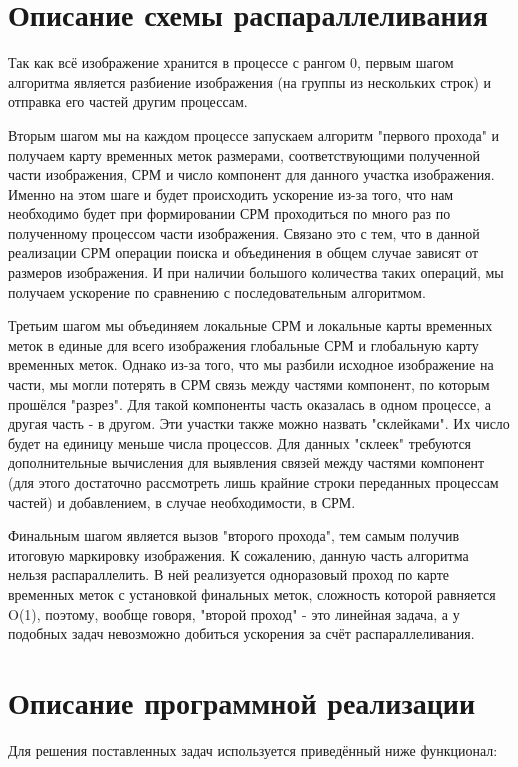\documentclass{report}
\begin{document}
	\section*{Описание схемы распараллеливания}
		\par Так как всё изображение хранится в процессе с рангом 0, первым шагом алгоритма является разбиение изображения (на группы из нескольких строк) и отправка его частей другим процессам.
		\par Вторым шагом мы на каждом процессе запускаем алгоритм "первого прохода" и получаем карту временных меток размерами, соответствующими полученной части изображения, СРМ и число компонент для данного участка изображения. Именно на этом шаге и будет происходить ускорение из-за того, что нам необходимо будет при формировании СРМ проходиться по много раз по полученному процессом части изображения. Связано это с тем, что в данной реализации СРМ операции поиска и объединения в общем случае зависят от размеров изображения. И при наличии большого количества таких операций, мы получаем ускорение по сравнению с последовательным алгоритмом.
		\par Третьим шагом мы объединяем локальные СРМ и локальные карты временных меток в единые для всего изображения глобальные СРМ и глобальную карту временных меток. Однако из-за того, что мы разбили исходное изображение на части, мы могли потерять в СРМ связь между частями компонент, по которым прошёлся "разрез". Для такой компоненты часть оказалась в одном процессе, а другая часть - в другом. Эти участки также можно назвать "склейками". Их число будет на единицу меньше числа процессов. Для данных "склеек" требуются дополнительные вычисления для выявления связей между частями компонент (для этого достаточно рассмотреть лишь крайние строки переданных процессам частей) и добавлением, в случае необходимости, в СРМ.
		\par Финальным шагом является вызов "второго прохода"{}, тем самым получив итоговую маркировку изображения. К сожалению, данную часть алгоритма нельзя распараллелить. В ней реализуется одноразовый проход по карте временных меток с установкой финальных меток, сложность которой равняется O(1), поэтому, вообще говоря, "второй проход"{} - это линейная задача, а у подобных задач невозможно добиться ускорения за счёт распараллеливания.
	\newpage


	\section*{Описание программной реализации}
		\par Для решения поставленных задач используется приведённый ниже функционал:
\end{document}
